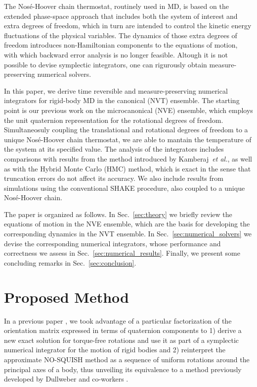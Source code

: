 \documentclass[
journal=jctcce,
layout=twocolumn
]{achemso}
\begin{document}
The Nos\'{e}-Hoover chain thermostat,\cite{Martyna_1992} routinely used in MD, is based on the extended phase-space approach that includes both the system of interest and extra degrees of freedom, which in turn are intended to control the kinetic energy fluctuations of the physical variables. The dynamics of those extra degrees of freedom introduces non-Hamiltonian components to the equations of motion, with which backward error analysis is no longer feasible. Altough it is not possible to devise symplectic integrators, one can rigurously obtain measure-preserving numerical solvers.\cite{Sergi_2001, Ezra_2004, Ezra_2006}

In this paper, we derive time reversible and measure-preserving numerical integrators for rigid-body MD in the canonical (NVT) ensemble. The starting point is our previous work on the microcanonical (NVE) ensemble,\citep{Silveira_2017} which employs the unit quaternion representation for the rotational degrees of freedom. Simultaneosuly coupling the translational and rotational degrees of freedom to a unique Nos\'{e}-Hoover chain thermostat, we are able to mantain the temperature of the system at its specified value. The analysis of the integrators includes comparisons with results from the method introduced by Kamberaj~\textit{et al.},\cite{Kamberaj_2005} as well as with the Hybrid Monte Carlo (HMC) method,\cite{Duane_1987} which is exact in the sense that truncation errors do not affect its accuracy. We also include results from simulations using the conventional SHAKE\cite{Ryckaert_1977} procedure, also coupled to a unique Nos\'{e}-Hoover chain.

The paper is organized as follows. In Sec.~\ref{sec:theory} we briefly review the equations of motion in the NVE ensemble, which are the basis for developing the corresponding dynamics in the NVT ensemble. In Sec.~\ref{sec:numerical_solvers} we devise the corresponding numerical integrators, whose performance and correctness we assess in Sec.~\ref{sec:numerical_results}. Finally, we present some concluding remarks in Sec.~\ref{sec:conclusion}.

\section{Proposed Method}
\label{sec:methodology}

In a previous paper \cite{Silveira_2017}, we took advantage of a particular factorization of the orientation matrix expressed in terms of quaternion components to 1) derive a new exact solution for torque-free rotations and use it as part of a symplectic numerical integrator for the motion of rigid bodies and 2) reinterpret the approximate NO-SQUISH method \cite{Miller_2002} as a sequence of uniform rotations around the principal axes of a body, thus unveiling its equivalence to a method previously developed by Dullweber and co-workers \cite{Dullweber_1997}.
\end{document}
